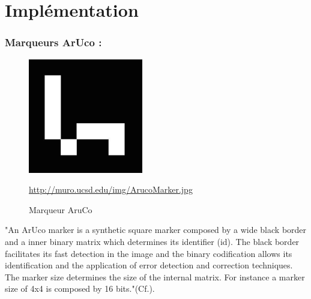 \documentclass[12pt,a4paper]{article}
\begin{document}
\section{Implémentation}


\subsubsection{Marqueurs ArUco :}

\begin{figure}[h!]
  \centering
  \label{label-aruco}
  \includegraphics[width = 5cm,height=5cm]{ArucoMarker.jpg}
  \caption{Marqueur AruCo}
  \href{url}{http://muro.ucsd.edu/img/ArucoMarker.jpg} 
  
\end{figure}

"An ArUco marker is a synthetic square marker composed by a wide black border and a inner binary matrix which determines its identifier (id). The black border facilitates its fast detection in the image and the binary codification allows its identification and the application of error detection and correction techniques. The marker size determines the size of the internal matrix. For instance a marker size of 4x4 is composed by 16 bits."(Cf.\cite{ref16}).

\end{document}
